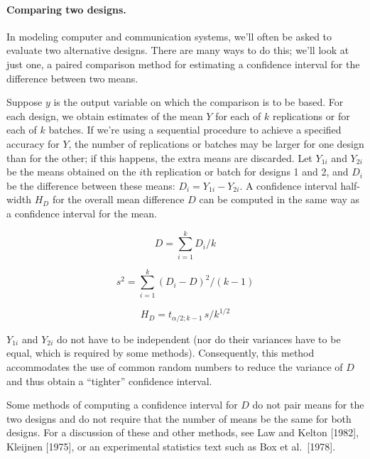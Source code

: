 \paragraph{Comparing two designs.}
In modeling computer and communication systems, we'll often be asked to
evaluate two alternative designs. There are many ways to do this; we'll look at
just one, a paired comparison method for estimating a confidence interval for
the difference between two means.

Suppose $y$ is the output variable on which the comparison is to be based. For
each design, we obtain estimates of the mean $Y$ for each of $k$ replications or
for each of $k$ batches. If we're using a sequential procedure to achieve a
specified accuracy for $Y$, the number of replications or batches may be larger
for one design than for the other; if this happens, the extra means are
discarded. Let $Y_{1i}$ and $Y_{2i}$ be the means obtained on the $i$th
replication or batch for designs 1 and 2, and $D_i$ be the difference between
these means: $D_i = Y_{1i} - Y_{2i}$. A confidence interval half-width $H_D$ for
the overall mean difference $D$ can be computed in the same way as a
confidence interval for the mean.

\begin{equation}
D = \sum_{i=1}^{k} D_i / k
\label{eq:output-mean-d}
\end{equation}

\begin{equation}
s^2 = \sum_{i=1}^{k} (D_i - D)^2 / (k - 1)
\label{eq:output-var-d}
\end{equation}

\begin{equation}
H_D = t_{\alpha/2;k-1} \, s / k^{1/2}
\label{eq:output-ci-d}
\end{equation}

$Y_{1i}$ and $Y_{2i}$ do not have to be independent (nor do their variances have
to be equal, which is required by some methods). Consequently, this method
accommodates the use of common random numbers to reduce the variance of $D$ and
thus obtain a ``tighter'' confidence interval.

Some methods of computing a confidence interval for $D$ do not pair means for
the two designs and do not require that the number of means be the same for
both designs. For a discussion of these and other methods, see Law and Kelton
[1982], Kleijnen [1975], or an experimental statistics text such as Box et al.\
[1978].


